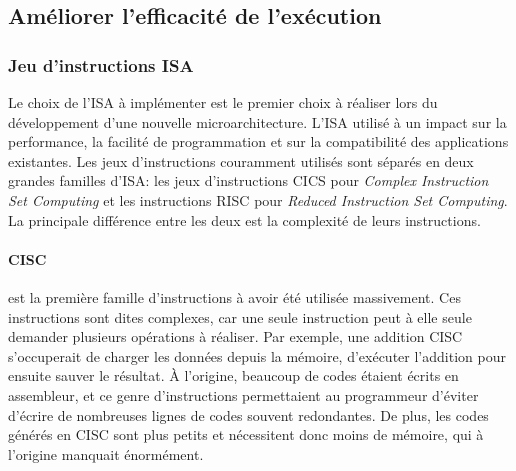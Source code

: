     







\subsection{Améliorer l'efficacité de l'exécution} \label{sec:efficacite}



        
    \subsubsection{Jeu d'instructions ISA } \label{sec:isa}
    
        Le choix de l'ISA à implémenter est le premier choix à réaliser lors du développement d'une nouvelle microarchitecture. L'ISA utilisé à un impact sur la performance, la facilité de programmation et sur la compatibilité des applications existantes. Les jeux d'instructions couramment utilisés sont séparés en deux grandes familles d'ISA: les jeux d'instructions CICS pour \textit{Complex Instruction Set Computing} et les instructions RISC pour \textit{Reduced Instruction Set Computing}. La principale différence entre les deux est la complexité de leurs instructions. 
        
            \paragraph{CISC} est la première famille d'instructions à avoir été utilisée massivement. Ces instructions sont dites complexes, car une seule instruction peut à elle seule demander plusieurs opérations à réaliser. Par exemple, une addition CISC s'occuperait de charger les données depuis la mémoire, d'exécuter l'addition pour ensuite sauver le résultat. À l'origine, beaucoup de codes étaient écrits en assembleur, et ce genre d'instructions permettaient au programmeur d'éviter d'écrire de nombreuses lignes de codes souvent redondantes. De plus, les codes générés en CISC sont plus petits et nécessitent donc moins de mémoire, qui à l'origine manquait énormément.
        
